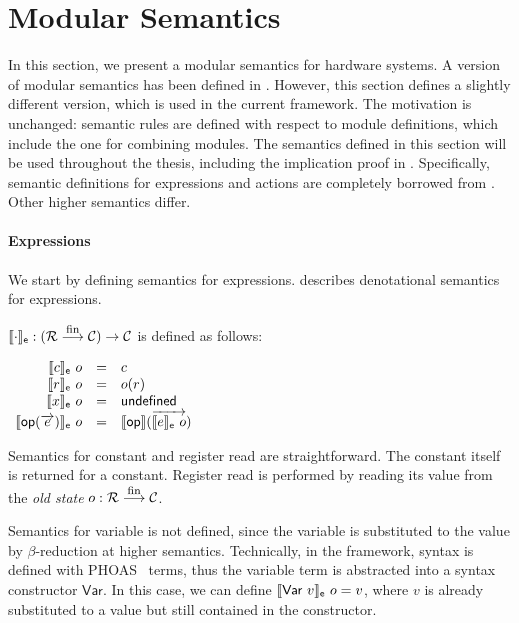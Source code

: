 \section{Modular Semantics}
\label{sec-semmod}

In this section, we present a modular semantics for hardware
systems. A version of modular semantics has been defined in
\cite{murali-thesis}.  However, this section defines a slightly
different version, which is used in the current \Kami{} framework.
The motivation is unchanged: semantic rules are defined with respect
to module definitions, which include the one for combining
modules. The semantics defined in this section will be used throughout
the thesis, including the implication proof in
. Specifically, semantic definitions for
expressions and actions are completely borrowed from
\cite{murali-thesis}. Other higher semantics differ.

\paragraph{Expressions}

We start by defining semantics for expressions. 
describes denotational semantics \ssemexpr{\cdot} for expressions.

\begin{definition}
  \label{def-semexpr}
  $\llbracket \cdot \rrbracket_{\textsf{e}} : (\mathcal{R} \stackrel{\textrm{\footnotesize{fin}}}{\longrightarrow} \mathcal{C}{}) \to \mathcal{C}$ is
  defined as follows:
  \begin{center}
    \begin{math}
      \begin{array}{rcl}
        \llbracket c \rrbracket_{\textsf{e}}\ o & = & c \\
        \llbracket r \rrbracket_{\textsf{e}}\ o & = & o(r) \\
        \llbracket x \rrbracket_{\textsf{e}}\ o & = & \textsf{undefined} \\
        \llbracket \textsf{op}{}(\overrightarrow{e}) \rrbracket_{\textsf{e}}\ o & = & \llbracket \textsf{op}{} \rrbracket(\overrightarrow{\llbracket e \rrbracket_{\textsf{e}}\ o}) \\
      \end{array}
    \end{math}
  \end{center}
\end{definition}

Semantics for constant and register read are straightforward. The
constant itself is returned for a constant. Register read is performed
by reading its value from the \emph{old state} $o: \mathcal{R} \stackrel{\textrm{\footnotesize{fin}}}{\longrightarrow} \mathcal{C}$.

Semantics for variable is not defined, since the variable is
substituted to the value by $\beta$-reduction at higher semantics.
Technically, in the \Kami{} framework, syntax is defined with
PHOAS~\cite{adam-icfp} terms, thus the variable term is abstracted
into a syntax constructor $\textsf{Var}$. In this case, we can define
$\llbracket \textsf{Var}\ v \rrbracket_{\textsf{e}}\ o = v$, where $v$ is already substituted
to a value but still contained in the constructor.

